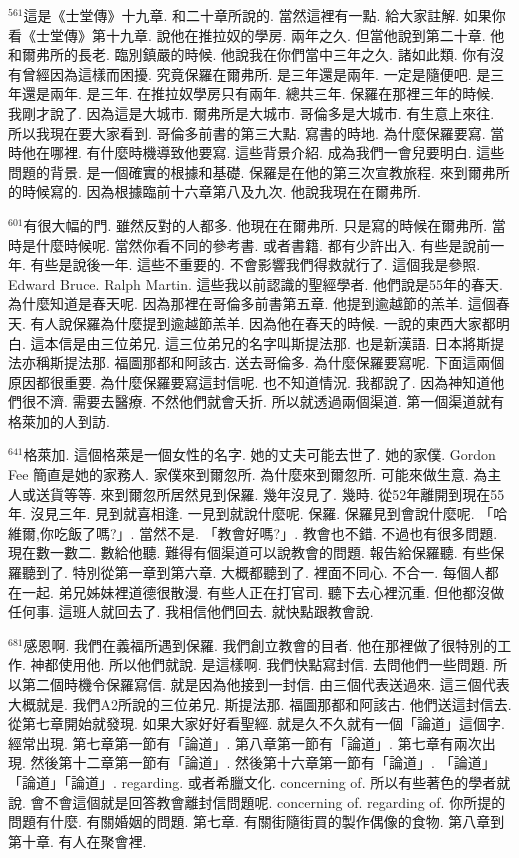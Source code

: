 \documentclass{book}
\begin{document}
$^{561}$這是《士堂傳》十九章.
和二十章所說的.
當然這裡有一點.
給大家註解.
如果你看《士堂傳》第十九章.
說他在推拉奴的學房.
兩年之久.
但當他說到第二十章.
他和爾弗所的長老.
臨別鎮嚴的時候.
他說我在你們當中三年之久.
諸如此類.
你有沒有曾經因為這樣而困擾.
究竟保羅在爾弗所.
是三年還是兩年.
一定是隨便吧.
是三年還是兩年.
是三年.
在推拉奴學房只有兩年.
總共三年.
保羅在那裡三年的時候.
我剛才說了.
因為這是大城市.
爾弗所是大城市.
哥倫多是大城市.
有生意上來往.
所以我現在要大家看到.
哥倫多前書的第三大點.
寫書的時地.
為什麼保羅要寫.
當時他在哪裡.
有什麼時機導致他要寫.
這些背景介紹.
成為我們一會兒要明白.
這些問題的背景.
是一個確實的根據和基礎.
保羅是在他的第三次宣教旅程.
來到爾弗所的時候寫的.
因為根據臨前十六章第八及九次.
他說我現在在爾弗所.

$^{601}$有很大幅的門.
雖然反對的人都多.
他現在在爾弗所.
只是寫的時候在爾弗所.
當時是什麼時候呢.
當然你看不同的參考書.
或者書籍.
都有少許出入.
有些是說前一年.
有些是說後一年.
這些不重要的.
不會影響我們得救就行了.
這個我是參照.
Edward Bruce.
Ralph Martin.
這些我以前認識的聖經學者.
他們說是55年的春天.
為什麼知道是春天呢.
因為那裡在哥倫多前書第五章.
他提到逾越節的羔羊.
這個春天.
有人說保羅為什麼提到逾越節羔羊.
因為他在春天的時候.
一說的東西大家都明白.
這本信是由三位弟兄.
這三位弟兄的名字叫斯提法那.
也是新漢語.
日本將斯提法亦稱斯提法那.
福圖那都和阿該古.
送去哥倫多.
為什麼保羅要寫呢.
下面這兩個原因都很重要.
為什麼保羅要寫這封信呢.
也不知道情況.
我都說了.
因為神知道他們很不濟.
需要去醫療.
不然他們就會夭折.
所以就透過兩個渠道.
第一個渠道就有格萊加的人到訪.

$^{641}$格萊加.
這個格萊是一個女性的名字.
她的丈夫可能去世了.
她的家僕.
Gordon Fee 簡直是她的家務人.
家僕來到爾忽所.
為什麼來到爾忽所.
可能來做生意.
為主人或送貨等等.
來到爾忽所居然見到保羅.
幾年沒見了.
幾時.
從52年離開到現在55年.
沒見三年.
見到就喜相逢.
一見到就說什麼呢.
保羅.
保羅見到會說什麼呢.
「哈維爾,你吃飯了嗎?」.
當然不是.
「教會好嗎?」.
教會也不錯.
不過也有很多問題.
現在數一數二.
數給他聽.
難得有個渠道可以說教會的問題.
報告給保羅聽.
有些保羅聽到了.
特別從第一章到第六章.
大概都聽到了.
裡面不同心.
不合一.
每個人都在一起.
弟兄姊妹裡道德很散漫.
有些人正在打官司.
聽下去心裡沉重.
但他都沒做任何事.
這班人就回去了.
我相信他們回去.
就快點跟教會說.

$^{681}$感恩啊.
我們在義福所遇到保羅.
我們創立教會的目者.
他在那裡做了很特別的工作.
神都使用他.
所以他們就說.
是這樣啊.
我們快點寫封信.
去問他們一些問題.
所以第二個時機令保羅寫信.
就是因為他接到一封信.
由三個代表送過來.
這三個代表大概就是.
我們A2所說的三位弟兄.
斯提法那.
福圖那都和阿該古.
他們送這封信去.
從第七章開始就發現.
如果大家好好看聖經.
就是久不久就有一個「論道」這個字.
經常出現.
第七章第一節有「論道」.
第八章第一節有「論道」.
第七章有兩次出現.
然後第十二章第一節有「論道」.
然後第十六章第一節有「論道」.
「論道」「論道」「論道」.
regarding.
或者希臘文化.
concerning of.
所以有些著色的學者就說.
會不會這個就是回答教會離封信問題呢.
concerning of.
regarding of.
你所提的問題有什麼.
有關婚姻的問題.
第七章.
有關街隨街買的製作偶像的食物.
第八章到第十章.
有人在聚會裡.
\end{document}
